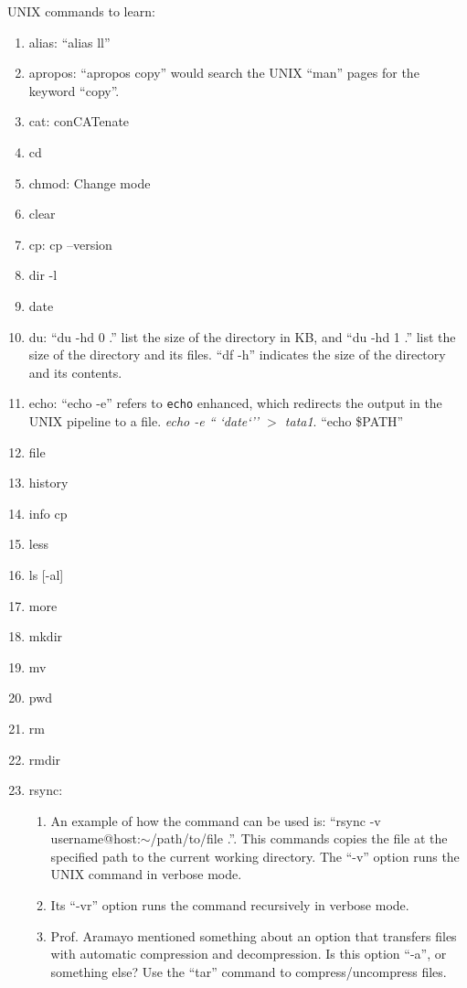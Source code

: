 UNIX commands to learn: \vspace{-0.3cm}
\begin{enumerate}	\itemsep -4pt
\item alias: ``alias ll''
\item apropos: ``apropos copy'' would search the UNIX ``man'' pages for the keyword ``copy''.
\item cat: conCATenate
\item cd
\item chmod: Change mode
\item clear
\item cp: cp --version
\item dir -l
\item date
\item du: ``du -hd 0 .'' list the size of the directory in KB, and ``du -hd 1 .'' list the size of the directory and its files. ``df -h'' indicates the size of the directory and its contents. 
\item echo: ``echo -e'' refers to {\tt echo} enhanced, which redirects the output in the UNIX pipeline to a file. {\it echo -e `` `date`'' $>$ tata1}. ``echo \$PATH''
\item file
\item history
\item info cp
\item less
\item ls [-al]
\item more
\item mkdir
\item mv
\item pwd
\item rm
\item rmdir
\item rsync: \vspace{-0.3cm}
	\begin{enumerate} \itemsep -2pt
	\item An example of how the command can be used is: ``rsync -v username@host:$\sim$/path/to/file .''. This commands copies the file at the specified path to the current working directory. The ``-v'' option runs the UNIX command in verbose mode.
	\item Its ``-vr'' option runs the command recursively in verbose mode.
	\item Prof. Aramayo mentioned something about an option that transfers files with automatic compression and decompression. Is this option ``-a'', or something else? Use the ``tar'' command to compress/uncompress files.
	\end{enumerate}

\end{enumerate}
